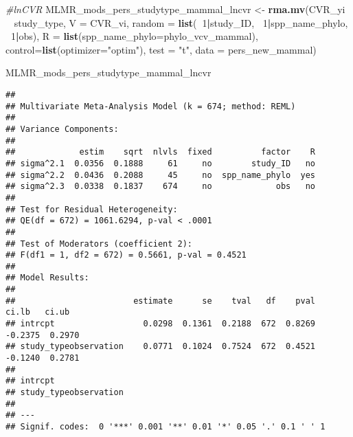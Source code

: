 \documentclass[]{article}
\newenvironment{Shaded}{\begin{snugshade}}{\end{snugshade}}
\newcommand{\KeywordTok}[1]{\textcolor[rgb]{0.13,0.29,0.53}{\textbf{#1}}}
\newcommand{\DataTypeTok}[1]{\textcolor[rgb]{0.13,0.29,0.53}{#1}}
\newcommand{\DecValTok}[1]{\textcolor[rgb]{0.00,0.00,0.81}{#1}}
\newcommand{\StringTok}[1]{\textcolor[rgb]{0.31,0.60,0.02}{#1}}
\newcommand{\CommentTok}[1]{\textcolor[rgb]{0.56,0.35,0.01}{\textit{#1}}}
\newcommand{\OperatorTok}[1]{\textcolor[rgb]{0.81,0.36,0.00}{\textbf{#1}}}
\newcommand{\NormalTok}[1]{#1}
\begin{document}
\begin{Shaded}
\begin{Highlighting}[]
    \CommentTok{#lnCVR}
\NormalTok{    MLMR_mods_pers_studytype_mammal_lncvr <-}\StringTok{ }\KeywordTok{rma.mv}\NormalTok{(CVR_yi }\OperatorTok{~}\StringTok{ }\NormalTok{study_type, }\DataTypeTok{V =}\NormalTok{ CVR_vi, }
                                                   \DataTypeTok{random =} \KeywordTok{list}\NormalTok{(}\OperatorTok{~}\DecValTok{1}\OperatorTok{|}\NormalTok{study_ID, }\OperatorTok{~}\DecValTok{1}\OperatorTok{|}\NormalTok{spp_name_phylo, }\OperatorTok{~}\DecValTok{1}\OperatorTok{|}\NormalTok{obs), }
                                                   \DataTypeTok{R =} \KeywordTok{list}\NormalTok{(}\DataTypeTok{spp_name_phylo=}\NormalTok{phylo_vcv_mammal), }\DataTypeTok{control=}\KeywordTok{list}\NormalTok{(}\DataTypeTok{optimizer=}\StringTok{"optim"}\NormalTok{), }
                                                   \DataTypeTok{test =} \StringTok{"t"}\NormalTok{, }\DataTypeTok{data =}\NormalTok{ pers_new_mammal)}
    
\NormalTok{    MLMR_mods_pers_studytype_mammal_lncvr}
\end{Highlighting}
\end{Shaded}

\begin{verbatim}
## 
## Multivariate Meta-Analysis Model (k = 674; method: REML)
## 
## Variance Components:
## 
##             estim    sqrt  nlvls  fixed          factor    R 
## sigma^2.1  0.0356  0.1888     61     no        study_ID   no 
## sigma^2.2  0.0436  0.2088     45     no  spp_name_phylo  yes 
## sigma^2.3  0.0338  0.1837    674     no             obs   no 
## 
## Test for Residual Heterogeneity:
## QE(df = 672) = 1061.6294, p-val < .0001
## 
## Test of Moderators (coefficient 2):
## F(df1 = 1, df2 = 672) = 0.5661, p-val = 0.4521
## 
## Model Results:
## 
##                        estimate      se    tval   df    pval    ci.lb   ci.ub 
## intrcpt                  0.0298  0.1361  0.2188  672  0.8269  -0.2375  0.2970 
## study_typeobservation    0.0771  0.1024  0.7524  672  0.4521  -0.1240  0.2781 
##  
## intrcpt 
## study_typeobservation 
## 
## ---
## Signif. codes:  0 '***' 0.001 '**' 0.01 '*' 0.05 '.' 0.1 ' ' 1
\end{verbatim}
\end{document}
